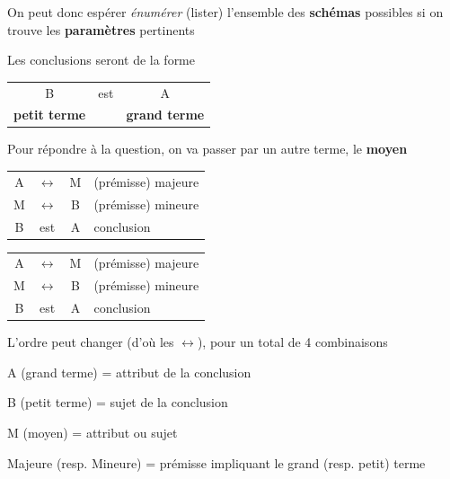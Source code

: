 \begin{frame}
	
	\begin{description}[labelindent=6pt,style=multiline,leftmargin=1.3in]
		 \setlength\itemsep{1em}
		 
		 \item[Idée] On peut donc espérer \textit{énumérer} (lister) l'ensemble des \textbf{schémas} possibles si on trouve les \textbf{paramètres} pertinents
		 \pause
		 \item[Définition] Les conclusions seront de la forme 
\begin{tabular}[t]{clc}
B &est& A\\
\textbf{petit terme} &&\textbf{grand terme}\\
\end{tabular}
 \pause
		 \item[Définition] Pour répondre à la question, on va passer par un autre terme, le \textbf{moyen}
\pause

		 \item[]
\begin{tabular}{cccl}
A  & $\leftrightarrow$ & M & (prémisse) majeure\\
M  & $\leftrightarrow$ & B & (prémisse) mineure\\
\hline
B  & est & A & conclusion\\
\end{tabular}
	\end{description}
\end{frame}


\begin{frame}
	
	\begin{description}[labelindent=6pt,style=multiline,leftmargin=1.3in]
		 \setlength\itemsep{1em}
		 
		 \item[]
\begin{tabular}{cccl}
A  & $\leftrightarrow$ & M & (prémisse) majeure\\
M  & $\leftrightarrow$ & B & (prémisse) mineure\\
\hline
B  & est & A & conclusion\\
\end{tabular}

\item[Remarque] L'ordre peut changer (d'où les $\leftrightarrow$)\pause, pour un total de 4 combinaisons
\pause
\item[Constantes] A (grand terme) = attribut de la conclusion \pause
\item[] B (petit terme) = sujet de la conclusion \pause 
\item[] M (moyen) = attribut ou sujet \newline \pause 
	\end{description} 

	Majeure (resp. Mineure) = prémisse impliquant le grand (resp. petit) terme 
\end{frame}




